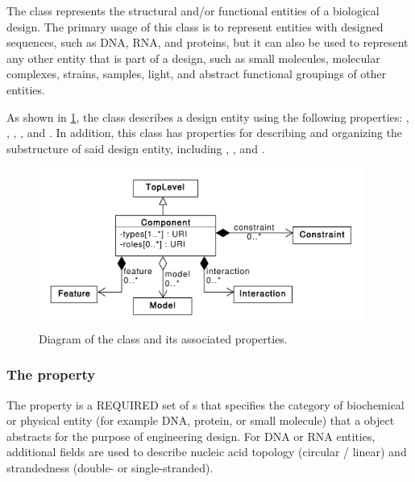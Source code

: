 The  class represents the structural and/or functional entities of a biological design. The primary usage of this class is to represent entities with designed sequences, such as DNA, RNA, and proteins, but it can also be used to represent any other entity that is part of a design, such as small molecules, molecular complexes, strains, samples, light, and abstract functional groupings of other entities.

As shown in \ref{uml:component}, the  class describes a design entity using the following properties: , , , , and . 
In addition, this class has properties for describing and organizing the substructure of said design entity, including , , and .

\begin{figure}[ht]
\begin{center}
\includegraphics[width=0.95\textwidth]{uml/component}
\caption[]{Diagram of the  class and its associated properties.}
\label{uml:component}
\end{center}
\end{figure}

\subsubsection*{The  property}
\label{sec:types:CD}

The  property is a REQUIRED set of s that
specifies the category of biochemical or physical entity (for example DNA,
protein, or small molecule) that a  object abstracts
for the purpose of engineering design. For DNA or RNA entities,
additional  fields are used to describe nucleic acid
topology (circular / linear) and strandedness (double- or single-stranded).

